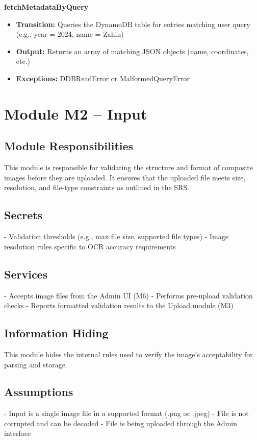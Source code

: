 \documentclass[12pt, titlepage]{article}
\begin{document}
\textbf{fetchMetadataByQuery}
\begin{itemize}
  \item \textbf{Transition:} Queries the DynamoDB table for entries matching user query (e.g., year = 2024, name = Zahin)
  \item \textbf{Output:} Returns an array of matching JSON objects (name, coordinates, etc.)
  \item \textbf{Exceptions:} DDBReadError or MalformedQueryError
\end{itemize}




\section{Module M2 – Input}
\label{SecM2}

\subsection*{Module Responsibilities}
This module is responsible for validating the structure and format of composite images before they are uploaded. It ensures that the uploaded file meets size, resolution, and file-type constraints as outlined in the SRS.

\subsection*{Secrets}
- Validation thresholds (e.g., max file size, supported file types)  
- Image resolution rules specific to OCR accuracy requirements

\subsection*{Services}
- Accepts image files from the Admin UI (M6)
- Performs pre-upload validation checks
- Reports formatted validation results to the Upload module (M3)

\subsection*{Information Hiding}
This module hides the internal rules used to verify the image's acceptability for parsing and storage.

\subsection*{Assumptions}
- Input is a single image file in a supported format (.png or .jpeg)
- File is not corrupted and can be decoded
- File is being uploaded through the Admin interface
\end{document}
